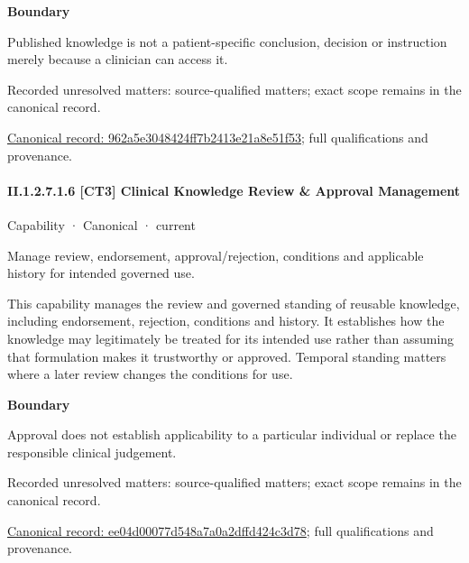 \textbf{Boundary}



Published knowledge is not a patient-specific conclusion, decision or instruction merely because a clinician can access it.


{\small Recorded unresolved matters: source-qualified matters; exact scope remains in the canonical record.}\par
{\footnotesize \href{../../../../../../../continuum/strategy/capability/962a5e3048424ff7b2413e21a8e51f53.md}{Canonical record: 962a5e3048424ff7b2413e21a8e51f53}; full qualifications and provenance.}\par
\paragraph*{II.1.2.7.1.6 [CT3] Clinical Knowledge Review \& Approval Management}
\label{navigation:II.1.2.7.1.6}

\label{element:ee04d00077d548a7a0a2dffd424c3d78}
{\small Capability · Canonical · current}\par

Manage review, endorsement, approval/rejection, conditions and applicable history for intended governed use.



This capability manages the review and governed standing of reusable knowledge, including endorsement, rejection, conditions and history. It establishes how the knowledge may legitimately be treated for its intended use rather than assuming that formulation makes it trustworthy or approved. Temporal standing matters where a later review changes the conditions for use.



\textbf{Boundary}



Approval does not establish applicability to a particular individual or replace the responsible clinical judgement.


{\small Recorded unresolved matters: source-qualified matters; exact scope remains in the canonical record.}\par
{\footnotesize \href{../../../../../../../continuum/strategy/capability/ee04d00077d548a7a0a2dffd424c3d78.md}{Canonical record: ee04d00077d548a7a0a2dffd424c3d78}; full qualifications and provenance.}\par
